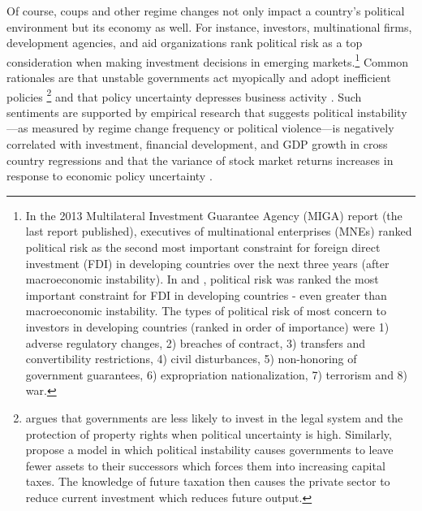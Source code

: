 \documentclass[12pt,final,fleqn]{article}
\theoremstyle{plain}
\begin{document}
Of course, coups and other regime changes not only impact a country's political environment but its economy as well. For instance, investors, multinational firms, development agencies, and aid organizations rank political risk as a top consideration when making investment decisions in emerging markets.\footnote{In the 2013 Multilateral Investment Guarantee Agency (MIGA) \citet{wipr2013} report (the last report published), executives of multinational enterprises (MNEs) ranked political risk as the second most important constraint for foreign direct investment (FDI) in developing countries over the next three years (after macroeconomic instability). In \citet{wipr2011} and  \citet{wipr2012}, political risk was ranked the most important constraint for FDI in developing countries - even greater than macroeconomic instability. The types of political risk of most concern to investors in developing countries (ranked in order of importance) were 1) adverse regulatory changes, 2) breaches of contract, 3) transfers and convertibility restrictions, 4) civil disturbances, 5) non-honoring of government guarantees, 6) expropriation nationalization, 7) terrorism and 8) war.} Common rationales are that unstable governments act myopically and adopt inefficient policies \citep{svensson1998investment,devereux1998political}\footnote{\citet{svensson1998investment} argues that governments are less likely to invest in the legal system and the protection of property rights when political uncertainty is high. Similarly, \citet{devereux1998political} propose a model in which political instability causes governments to leave fewer assets to their successors which forces them into increasing capital taxes. The knowledge of future taxation then causes the private sector to reduce current investment which reduces future output.} and that policy uncertainty depresses business activity \citep{baker2016measuring}. Such sentiments are supported by empirical research that suggests political instability---as measured by regime change frequency or political violence---is negatively correlated with investment, financial development, and GDP growth in cross country regressions \citep{aisen2013does, alesina1996income, alesina1996political, fosu1992political, jong2009measurement, roe2011political} and that the variance of stock market returns increases in response to economic policy uncertainty \citep{leblang2005government, jensen2005market, liu2015economic}.
\end{document}
